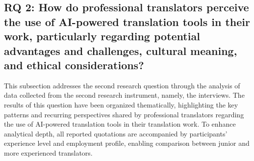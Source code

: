 \documentclass[english]{textolivre}
\begin{document}
\subsection{RQ 2: How do professional translators perceive the use of AI-powered translation tools in their work, particularly regarding potential advantages and challenges, cultural meaning, and ethical considerations?}\label{sec-links}
This subsection addresses the second research question through the analysis of data collected from the second research instrument, namely, the interviews. The results of this question have been organized thematically, highlighting the key patterns and recurring perspectives shared by professional translators regarding the use of AI-powered translation tools in their translation work. To enhance analytical depth, all reported quotations are accompanied by participants’ experience level and employment profile, enabling comparison between junior and more experienced translators.
\end{document}
